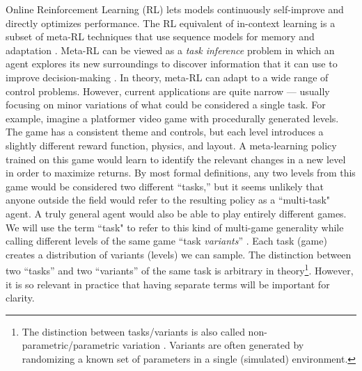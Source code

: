 \documentclass{article}
\begin{document}
Online Reinforcement Learning (RL) lets models continuously self-improve and directly optimizes performance. The RL equivalent of in-context learning is a subset of meta-RL techniques that use sequence models for memory and adaptation \cite{beck2023survey, wang2016learning, duan2016rl}. Meta-RL can be viewed as a \textit{task inference} problem in which an agent explores its new surroundings to discover information that it can use to improve decision-making \cite{humplik2019meta, ghosh2021generalization, zintgraf2022fast}. In theory, meta-RL can adapt to a wide range of control problems. However, current applications are quite narrow ---  usually focusing on minor variations of what could be considered a single task. For example, imagine a platformer video game with procedurally generated levels. The game has a consistent theme and controls, but each level introduces a slightly different reward function, physics, and layout. A meta-learning policy trained on this game would learn to identify the relevant changes in a new level in order to maximize returns. By most formal definitions, any two levels from this game would be considered two different ``tasks,'' but it seems unlikely that anyone outside the field would refer to the resulting policy as a ``multi-task" agent. A truly general agent would also be able to play entirely different games. We will use the term ``task" to refer to this kind of multi-game generality while calling different levels of the same game ``task \textit{variants}” \cite{zhao2022effectiveness, taiga2023investigating, rusu2022probing}. Each task (game) creates a distribution of variants (levels) we can sample. The distinction between two ``tasks'' and two ``variants'' of the same task is arbitrary in theory\footnote{The distinction between tasks/variants is also called non-parametric/parametric variation \cite{yu2020meta, lee2023parameterizing}. Variants are often generated by randomizing a known set of parameters in a single (simulated) environment.}. However, it is so relevant in practice that having separate terms will be important for clarity.
\end{document}
